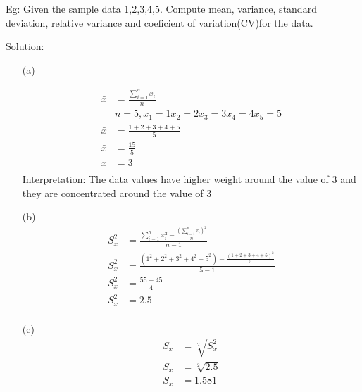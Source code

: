 \documentclass[12pt]{article}
\begin{document}
Eg: Given the sample data 1,2,3,4,5. Compute mean, variance, standard deviation, relative variance and coeficient of variation(CV)for the data.

Solution:

\begin{enumerate}
    \item[(a)]

        \begin{align*}
            \bar{x} & = \frac{\sum_{i = 1}^{n} x_i}{n}               \\
                    & n = 5, x_1 = 1 x_2 = 2 x_3 = 3 x_4 = 4 x_5 = 5 \\
            \bar{x} & = \frac{1 + 2 + 3 + 4 + 5}{5}                  \\
            \bar{x} & = \frac{15}{5}                                 \\
            \bar{x} & = 3                                            \\
        \end{align*}
        Interpretation: The data values have higher weight around the value of $3$ and they are concentrated around the value of $3$
    \item[(b)]
        \begin{align*}
            S_x^2 & = \frac{\sum_{i = 1}^{n}x_i^2 - \frac{(\sum_{i = 1}^{n}x_i)^2}{n}}{n-1}         \\
            S_x^2 & = \frac{(1^2 + 2^2 + 3^2 + 4^2 + 5^2) - \frac{(1 + 2 + 3 + 4 + 5)^2}{5}}{5 - 1} \\
            S_x^2 & = \frac{55 - 45}{4}                                                             \\
            S_x^2 & = 2.5                                                                           \\
        \end{align*}

    \item[(c)] \begin{align*}
            S_x & = \sqrt[2]{S_x^2} \\
            S_x & = \sqrt[2]{2.5}   \\
            S_x & = 1.581           \\
        \end{align*}



\end{enumerate}
\end{document}
